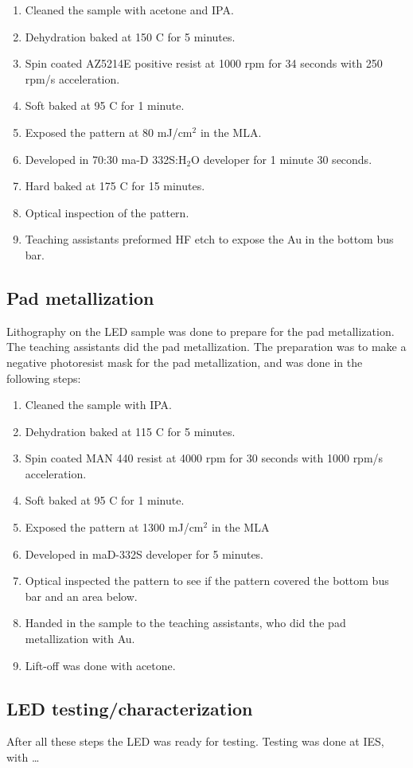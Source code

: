 \begin{enumerate}
    \item Cleaned the sample with acetone and IPA.
    \item Dehydration baked at 150 \textdegree C for 5 minutes.
    \item Spin coated AZ5214E positive resist at 1000 rpm for 34 seconds with 250 rpm/s acceleration.
    \item Soft baked at 95 \textdegree C for 1 minute.
    \item Exposed the pattern at 80 mJ/cm$^2$ in the MLA.
    \item Developed in 70:30 ma-D 332S:H$_2$O developer for 1 minute 30 seconds.
    \item Hard baked at 175 \textdegree C for 15 minutes.
    \item Optical inspection of the pattern.
    \item Teaching assistants preformed HF etch to expose the Au in the bottom bus bar.
\end{enumerate}



\subsection{Pad metallization}
\label{methods:pad_metallization}

Lithography on the LED sample was done to prepare for the pad metallization.
The teaching assistants did the pad metallization.
The preparation was to make a negative photoresist mask for the pad metallization, and was done in the following steps:
\begin{enumerate}
    \item Cleaned the sample with IPA.
    \item Dehydration baked at 115 \textdegree C for 5 minutes.
    \item Spin coated MAN 440 resist at 4000 rpm for 30 seconds with 1000 rpm/s acceleration.
    \item Soft baked at 95 \textdegree C for 1 minute.
    \item Exposed the pattern at 1300 mJ/cm$^2$ in the MLA
    \item Developed in maD-332S developer for 5 minutes.
    \item Optical inspected the pattern to see if the pattern covered the bottom bus bar and an area below.
    \item Handed in the sample to the teaching assistants, who did the pad metallization with Au.
    \item Lift-off was done with acetone.
\end{enumerate}


\subsection{LED testing/characterization}
\label{methods:LED_testing}
After all these steps the LED was ready for testing.
Testing was done at IES, with \dots
